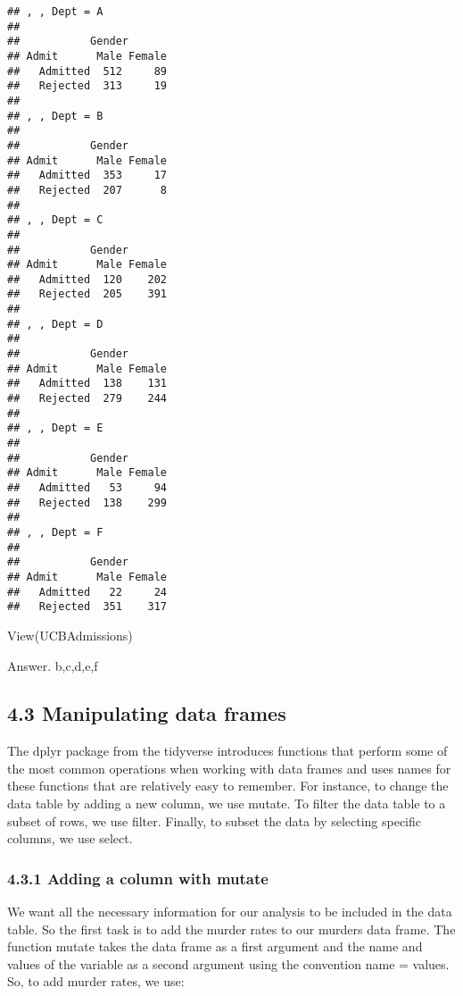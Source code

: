 \documentclass[
]{article}
\newenvironment{Shaded}{\begin{snugshade}}{\end{snugshade}}
\newcommand{\FunctionTok}[1]{\textcolor[rgb]{0.00,0.00,0.00}{#1}}
\newcommand{\NormalTok}[1]{#1}
\begin{document}
\begin{verbatim}
## , , Dept = A
## 
##           Gender
## Admit      Male Female
##   Admitted  512     89
##   Rejected  313     19
## 
## , , Dept = B
## 
##           Gender
## Admit      Male Female
##   Admitted  353     17
##   Rejected  207      8
## 
## , , Dept = C
## 
##           Gender
## Admit      Male Female
##   Admitted  120    202
##   Rejected  205    391
## 
## , , Dept = D
## 
##           Gender
## Admit      Male Female
##   Admitted  138    131
##   Rejected  279    244
## 
## , , Dept = E
## 
##           Gender
## Admit      Male Female
##   Admitted   53     94
##   Rejected  138    299
## 
## , , Dept = F
## 
##           Gender
## Admit      Male Female
##   Admitted   22     24
##   Rejected  351    317
\end{verbatim}

\begin{Shaded}
\begin{Highlighting}[]
\FunctionTok{View}\NormalTok{(UCBAdmissions)}
\end{Highlighting}
\end{Shaded}

Answer. b,c,d,e,f

\hypertarget{manipulating-data-frames}{%
\subsection{4.3 Manipulating data
frames}\label{manipulating-data-frames}}

The dplyr package from the tidyverse introduces functions that perform
some of the most common operations when working with data frames and
uses names for these functions that are relatively easy to remember. For
instance, to change the data table by adding a new column, we use
mutate. To filter the data table to a subset of rows, we use filter.
Finally, to subset the data by selecting specific columns, we use
select.

\hypertarget{adding-a-column-with-mutate}{%
\subsubsection{4.3.1 Adding a column with
mutate}\label{adding-a-column-with-mutate}}

We want all the necessary information for our analysis to be included in
the data table. So the first task is to add the murder rates to our
murders data frame. The function mutate takes the data frame as a first
argument and the name and values of the variable as a second argument
using the convention name = values. So, to add murder rates, we use:
\end{document}
